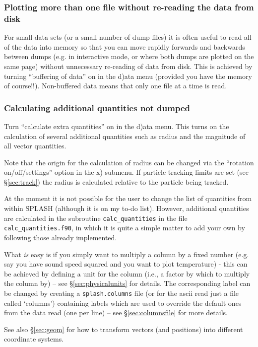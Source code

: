 \documentclass[a4paper,10pt]{article}
\newcommand{\splash}{\textsc{SPLASH }}
\begin{document}
\subsubsection{ Plotting more than one file without re-reading the data from disk}
\label{sec:buffering}
 For small data sets (or a small number of dump files) it is often useful to read all of the data into memory so that you can move rapidly forwards and backwards between dumps (e.g. in interactive mode, or where both dumps are plotted on the same page) without unnecessary re-reading of data from disk. This is achieved by turning ``buffering of data'' on in the d)ata menu (provided you have the memory of course!!). Non-buffered data means that only one file at a time is read.

\subsubsection{ Calculating additional quantities not dumped}
Turn ``calculate extra quantities'' on in the d)ata menu. This turns on the calculation of several additional quantities such as radius and the magnitude of all vector quantities. 

 Note that the origin for the calculation of radius can be changed via the ``rotation on/off/settings'' option in the x) submenu. If particle tracking limits are set (see \S\ref{sec:track}) the radius is calculated relative to the particle being tracked.

 At the moment it is not possible for the user to change the list of quantities from within \splash (although it is on my to-do list). However, additional quantities are calculated in the subroutine \verb+calc_quantities+ in the file \verb+calc_quantities.f90+, in which it is quite a simple matter to add your own by following those already implemented. 
 
 What \emph{is} easy is if you simply want to multiply a column by a fixed number (e.g. say you have sound speed squared and you want to plot temperature) - this can be achieved by defining a unit for the column (i.e., a factor by which to multiply the column by) -- see \S\ref{sec:physicalunits} for details. The corresponding label can be changed by creating a \verb+splash.columns+ file (or for the ascii read just a file called `columns') containing labels which are used to override the default ones from the data read (one per line) -- see \S\ref{sec:columnsfile} for more details.

See also \S\ref{sec:geom} for how to transform vectors (and positions) into different coordinate systems.
\end{document}
